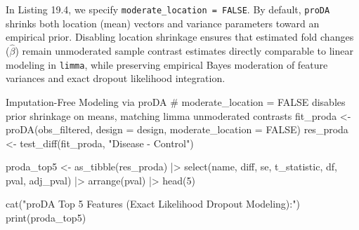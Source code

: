 \documentclass[11pt,oneside]{book}
\begin{document}
In Listing 19.4, we specify \texttt{moderate\_location = FALSE}. By default, \texttt{proDA} shrinks both location (mean) vectors and variance parameters toward an empirical prior. Disabling location shrinkage ensures that estimated fold changes ($\hat{\beta}$) remain unmoderated sample contrast estimates directly comparable to linear modeling in \texttt{limma}, while preserving empirical Bayes moderation of feature variances and exact dropout likelihood integration.

\begin{rchunk}{Imputation-Free Modeling via proDA}
# moderate_location = FALSE disables prior shrinkage on means, matching limma unmoderated contrasts
fit_proda <- proDA(obs_filtered, design = design, moderate_location = FALSE)
res_proda <- test_diff(fit_proda, "Disease - Control")

proda_top5 <- as_tibble(res_proda) |>
  select(name, diff, se, t_statistic, df, pval, adj_pval) |>
  arrange(pval) |>
  head(5)

cat("proDA Top 5 Features (Exact Likelihood Dropout Modeling):\n")
print(proda_top5)
\end{rchunk}
\end{document}
